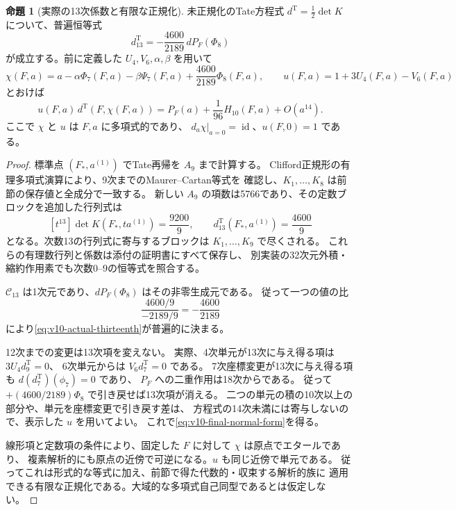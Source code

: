\documentclass[a4paper,11pt]{ltjsarticle}
\theoremstyle{definition}
\newtheorem{proposition}[theorem]{命題}
\newcommand{\id}{\operatorname{id}}
\begin{document}
\begin{proposition}[実際の13次係数と有限な正規化]
\label{prop:v10-explicit-thirteenth}
未正規化のTate方程式 $d^{\mathrm T}=\tfrac12\det K$ について、普遍恒等式
\begin{equation}\label{eq:v10-actual-thirteenth}
 d^{\mathrm T}_{13}=-\frac{4600}{2189}\,dP_F(\Phi_8)
\end{equation}
が成立する。前に定義した $U_4,V_6,\alpha,\beta$ を用いて
\[
 \chi(F,a)=a-\alpha\Phi_7(F,a)-\beta\Psi_7(F,a)
                         +\frac{4600}{2189}\Phi_8(F,a),
 \qquad u(F,a)=1+3U_4(F,a)-V_6(F,a)
\]
とおけば
\begin{equation}\label{eq:v10-final-normal-form}
 \boxed{
 u(F,a)\,d^{\mathrm T}(F,\chi(F,a))
   =P_F(a)+\frac1{96}H_{10}(F,a)+O(a^{14}).
 }
\end{equation}
ここで $\chi$ と $u$ は $F,a$ に多項式的であり、
$d_a\chi|_{a=0}=\id$、$u(F,0)=1$ である。
\end{proposition}
\begin{proof}
標準点 $(F_*,a^{(1)})$ でTate再帰を $A_9$ まで計算する。
Clifford正規形の有理多項式演算により、9次までのMaurer--Cartan等式を
確認し、$K_1,\ldots,K_8$ は前節の保存値と全成分で一致する。
新しい $A_9$ の項数は5766であり、その定数ブロックを追加した行列式は
\[
 [t^{13}]\det K(F_*,t a^{(1)})=\frac{9200}{9},\qquad
 d^{\mathrm T}_{13}(F_*,a^{(1)})=\frac{4600}{9}
\]
となる。次数13の行列式に寄与するブロックは $K_1,\ldots,K_9$ で尽くされる。
これらの有理数行列と係数は添付の証明書にすべて保存し、
別実装の32次元外積・縮約作用素でも次数0--9の恒等式を照合する。

$\mathcal C_{13}$ は1次元であり、$dP_F(\Phi_8)$ はその非零生成元である。
従って一つの値の比
\[
 \frac{4600/9}{-2189/9}=-\frac{4600}{2189}
\]
により\eqref{eq:v10-actual-thirteenth}が普遍的に決まる。

12次までの変更は13次項を変えない。
実際、4次単元が13次に与え得る項は $3U_4d^{\mathrm T}_9=0$、
6次単元からは $V_6d^{\mathrm T}_7=0$ である。
7次座標変更が13次に与え得る項も $d(d^{\mathrm T}_7)(\phi_7)=0$ であり、
$P_F$ への二重作用は18次からである。
従って $+(4600/2189)\Phi_8$ で引き戻せば13次項が消える。
二つの単元の積の10次以上の部分や、単元を座標変更で引き戻す差は、
方程式の14次未満には寄与しないので、表示した $u$ を用いてよい。
これで\eqref{eq:v10-final-normal-form}を得る。

線形項と定数項の条件により、固定した $F$ に対して $\chi$ は原点でエタールであり、
複素解析的にも原点の近傍で可逆になる。$u$ も同じ近傍で単元である。
従ってこれは形式的な等式に加え、前節で得た代数的・収束する解析的族に
適用できる有限な正規化である。大域的な多項式自己同型であるとは仮定しない。
\end{proof}
\end{document}
